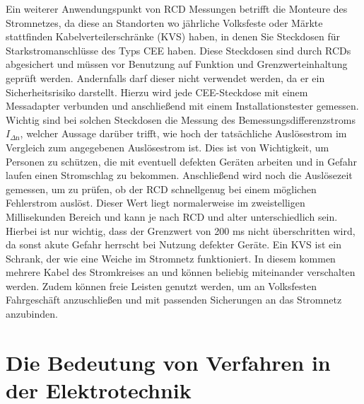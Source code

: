 Ein weiterer Anwendungspunkt von RCD Messungen betrifft die Monteure des Stromnetzes, da diese an Standorten wo jährliche Volksfeste oder Märkte stattfinden 
Kabelverteilerschränke (KVS) haben, in denen Sie Steckdosen für Starkstromanschlüsse des Typs CEE haben. Diese Steckdosen sind durch RCDs abgesichert und 
müssen vor Benutzung auf Funktion und Grenzwerteinhaltung geprüft werden. Andernfalls darf dieser nicht verwendet werden, da er ein Sicherheitsrisiko 
darstellt. Hierzu wird jede CEE-Steckdose mit einem Messadapter verbunden und anschließend mit einem Installationstester gemessen. Wichtig sind bei solchen 
Steckdosen die Messung des Bemessungsdifferenzstroms $I_{\Delta \text{n}}$, welcher Aussage darüber trifft, wie hoch der tatsächliche Auslösestrom im Vergleich zum 
angegebenen Auslösestrom ist. Dies ist von Wichtigkeit, um Personen zu schützen, die mit eventuell defekten Geräten arbeiten und in Gefahr laufen einen 
Stromschlag zu bekommen. Anschließend wird noch die Auslösezeit gemessen, um zu prüfen, ob der RCD schnellgenug bei einem möglichen Fehlerstrom auslöst.
Dieser Wert liegt normalerweise im zweistelligen Millisekunden Bereich und kann je nach RCD und alter unterschiedlich sein. Hierbei ist nur wichtig, dass 
der Grenzwert von 200 ms nicht überschritten wird, da sonst akute Gefahr herrscht bei Nutzung defekter Geräte. \autocite{Rudnik.2020}
Ein KVS ist ein Schrank, der wie eine Weiche im Stromnetz funktioniert. In diesem kommen mehrere Kabel des Stromkreises an und können beliebig 
miteinander verschalten werden. Zudem können freie Leisten genutzt werden, um \zB an Volksfesten Fahrgeschäft anzuschließen und mit passenden Sicherungen 
an das Stromnetz anzubinden. \autocite{Schwab.2012}
\clearpage

\section{Die Bedeutung von Verfahren in der Elektrotechnik}

